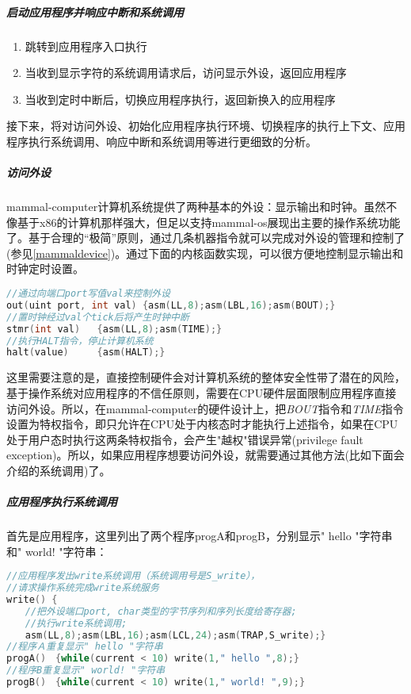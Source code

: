 \subparagraph{启动应用程序并响应中断和系统调用}

\begin{enumerate}
  \item 跳转到应用程序入口执行
  \item 当收到显示字符的系统调用请求后，访问显示外设，返回应用程序
  \item 当收到定时中断后，切换应用程序执行，返回新换入的应用程序
\end{enumerate}

接下来，将对访问外设、初始化应用程序执行环境、切换程序的执行上下文、应用程序执行系统调用、响应中断和系统调用等进行更细致的分析。

\subparagraph{访问外设}
mammal-computer计算机系统提供了两种基本的外设：显示输出和时钟。虽然不像基于x86的计算机那样强大，但足以支持mammal-os展现出主要的操作系统功能了。基于合理的“极简”原则，通过几条机器指令就可以完成对外设的管理和控制了(参见\ref*{mammaldevice})。通过下面的内核函数实现，可以很方便地控制显示输出和时钟定时设置。

\begin{lstlisting}[language={C}]
//通过向端口port写值val来控制外设
out(uint port, int val) {asm(LL,8);asm(LBL,16);asm(BOUT);}
//置时钟经过val个tick后将产生时钟中断
stmr(int val)   {asm(LL,8);asm(TIME);}
//执行HALT指令，停止计算机系统
halt(value)     {asm(HALT);}
\end{lstlisting}

这里需要注意的是，直接控制硬件会对计算机系统的整体安全性带了潜在的风险，基于操作系统对应用程序的不信任原则，需要在CPU硬件层面限制应用程序直接访问外设。所以，在mammal-computer的硬件设计上，把\textit{BOUT}指令和\textit{TIME}指令设置为特权指令，即只允许在CPU处于内核态时才能执行上述指令，如果在CPU处于用户态时执行这两条特权指令，会产生"越权"错误异常(privilege fault exception)。所以，如果应用程序想要访问外设，就需要通过其他方法(比如下面会介绍的系统调用)了。

\subparagraph{应用程序执行系统调用}
首先是应用程序，这里列出了两个程序progA和progB，分别显示" hello "字符串和" world! "字符串：
\begin{lstlisting}[language={C}]
//应用程序发出write系统调用（系统调用号是S_write），
//请求操作系统完成write系统服务
write() { 
　　//把外设端口port, char类型的字节序列和序列长度给寄存器; 
　　//执行write系统调用; 
　　asm(LL,8);asm(LBL,16);asm(LCL,24);asm(TRAP,S_write);}
//程序Ａ重复显示" hello "字符串
progA()　{while(current < 10) write(1," hello ",8);}
//程序B重复显示" world! "字符串
progB()　{while(current < 10) write(1," world! ",9);}
\end{lstlisting}

